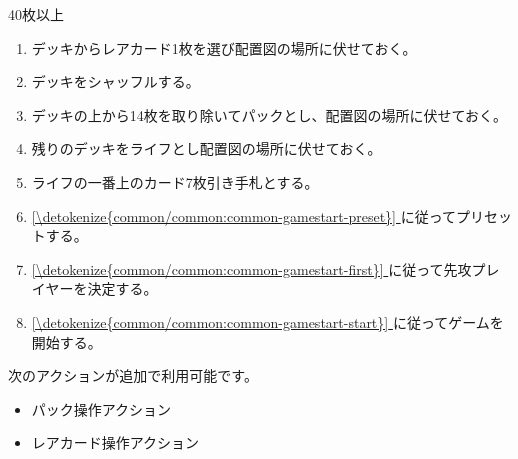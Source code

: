 \documentclass[letterpaper,10pt,dvipdfmx]{sphinxmanual}
\begin{document}
\sphinxAtStartPar
40枚以上

\sphinxAtStartPar
{}
\begin{enumerate}
%
\item {} 
\sphinxAtStartPar
デッキからレアカード1枚を選び配置図の場所に伏せておく。

\item {} 
\sphinxAtStartPar
デッキをシャッフルする。

\item {} 
\sphinxAtStartPar
デッキの上から14枚を取り除いてパックとし、配置図の場所に伏せておく。

\item {} 
\sphinxAtStartPar
残りのデッキをライフとし配置図の場所に伏せておく。

\item {} 
\sphinxAtStartPar
ライフの一番上のカード7枚引き手札とする。

\item {} 
\sphinxAtStartPar
\hyperref[\detokenize{common/common:common-gamestart-preset}]{\ref{\detokenize{common/common:common-gamestart-preset}} } に従ってプリセットする。

\item {} 
\sphinxAtStartPar
\hyperref[\detokenize{common/common:common-gamestart-first}]{\ref{\detokenize{common/common:common-gamestart-first}} } に従って先攻プレイヤーを決定する。

\item {} 
\sphinxAtStartPar
\hyperref[\detokenize{common/common:common-gamestart-start}]{\ref{\detokenize{common/common:common-gamestart-start}} } に従ってゲームを開始する。

\end{enumerate}

\sphinxAtStartPar
{}

\sphinxAtStartPar
次のアクションが追加で利用可能です。
\begin{itemize}
\item {} 
\sphinxAtStartPar
パック操作アクション

\item {} 
\sphinxAtStartPar
レアカード操作アクション

\end{itemize}
\end{document}
